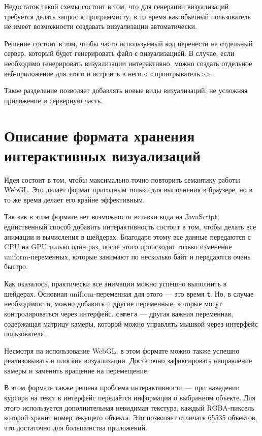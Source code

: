 Недостаток такой схемы состоит в том, что для генерации визуализаций требуется делать запрос к программисту, в то время как обычный пользователь не имеет возможности создавать визуализации автоматически.

Решение состоит в том, чтобы часто используемый код перенести на отдельный сервер, который будет генерировать файл с визуализацией. В случае, если необходимо генерировать визуализации интерактивно, можно создать отдельное веб-приложение для этого и встроить в него <<проигрыватель>>.

Такое разделение позволяет добавлять новые виды визуализаций, не усложняя приложение и серверную часть.

\section{Описание формата хранения интерактивных визуализаций}

\label{sec:format}

Идея состоит в том, чтобы максимально точно повторить семантику работы WebGL. Это делает формат пригодным только для выполнения в браузере, но в то же время делает его крайне эффективным.

Так как в этом формате нет возможности вставки кода на JavaScript, единственный способ добавить интерактивность состоит в том, чтобы делать все анимации и вычисления в шейдерах. Благодаря этому все данные передаются с CPU на GPU только один раз, после этого происходит только изменение uniform-переменных, которые занимают по несколько байт и передаются очень быстро.

Как оказалось, практически все анимации можно успешно выполнить в шейдерах. Основная uniform-переменная для этого --- это время \texttt{t}. Но, в случае необходимости, можно добавить и другие переменные, которые могут контролироваться через интерфейс. \texttt{camera} --- другая важная переменная, содержащая матрицу камеры, которой можно управлять мышкой через интерфейс пользователя.

Несмотря на использование WebGL, в этом формате можно также успешно реализовывать и плоские визуализации. Достаточно зафиксировать направление камеры и заменить вращение на перемещение.

В этом формате также решена проблема интерактивности --- при наведении курсора на текст в интерфейс передаётся информация о выбранном объекте. Для этого используется дополнительная невидимая текстура, каждый RGBA-пиксель которой хранит номер текущего объекта. Это позволяет отличать 65535 объектов, что достаточно для большинства приложений.

